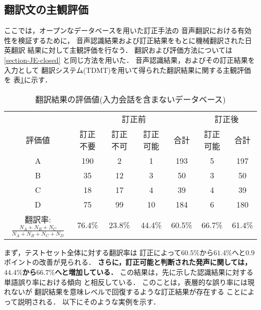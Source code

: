\subsection{翻訳文の主観評価}

ここでは，オープンなデータベースを用いた訂正手法の
音声翻訳における有効性を検証するために，
音声認識結果および訂正結果をもとに機械翻訳された日英翻訳
結果に対して主観評価を行なう．
翻訳および評価方法については\ref{section-JE-closed}
と同じ方法を用いた．
音声認識結果，およびその訂正結果を入力として
翻訳システム(TDMT)を用いて得られた翻訳結果に関する主観評価を
表\ref{JE-db-open-trans-rank}に示す．


\begin{table}
\begin{center}
\caption{翻訳結果の評価値(入力会話を含まないデータベース)}
\label{JE-db-open-trans-rank}
\begin{tabular}{|c||c|c|c||c||c||c|} \hline
 & \multicolumn{4}{c||}{訂正前} & \multicolumn{2}{c|}{訂正後}\\ \cline{2-7}
評価値 & 訂正不要 & 訂正不可 & 訂正可能 & 合計 & 訂正可能 & 合計 \\ \hline\hline
A & 190 & 2 & 1 & 193 & 5 & 197 \\ \hline
B & 35 & 12 & 3 & 50 & 3 & 50 \\ \hline
C & 18 & 17 & 4 & 39 & 4 & 39 \\ \hline
D & 75 & 99 & 10 & 184 & 6 & 180 \\ \hline\hline
翻訳率:$\frac{N_A+N_B+N_C}{N_A+N_B+N_C+N_D}$ & 76.4\% & 23.8\% & 44.4\% & 60.5\% & 66.7\% & 61.4\% \\ \hline
\end{tabular}
\end{center}
\end{table}


まず，テストセット全体に対する翻訳率は
訂正によって$60.5\%$から$61.4\%$へと$0.9$ポイントの改善が見られる．
{\bf さらに，訂正可能と判断された発声に関しては，
$44.4\%$から$66.7\%$へと増加している．}
この結果は，先に示した認識結果に対する単語誤り率における傾向
と相反している．
このことは，表層的な誤り率には現れないが
翻訳結果を意味レベルで回復するような訂正結果が存在する
ことによって説明される．
以下にそのような実例を示す．

